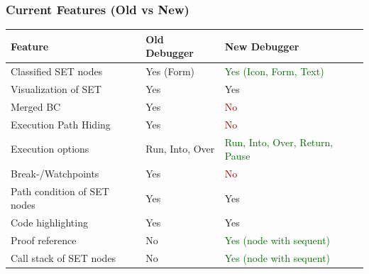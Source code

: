 \documentclass[accentcolor=tud9d,colorbacktitle,inverttitle,landscape,english,presentation,t]{tudbeamer}
\begin{document}
   	\begin{frame}[t]
		\frametitle{Current Features (Old vs New)}
      
      \begin{table}
         \centering
            \begin{tabular}{|l|l|l|}
               \hline
               Feature & Old Debugger & New Debugger \\
               \hline
               \hline
               Classified SET nodes & Yes (Form) & \textcolor{darkgreen}{Yes (Icon, Form, Text)} \\
               Visualization of SET & Yes & Yes \\
               Merged BC & Yes & \textcolor{darkred}{No} \\
               Execution Path Hiding & Yes & \textcolor{darkred}{No} \\ %
               Execution options & Run, Into, Over & \textcolor{darkgreen}{Run, Into, Over, Return, Pause} \\
               Break-/Watchpoints & Yes & \textcolor{darkred}{No} \\
               Path condition of SET nodes & Yes & Yes \\
               Code highlighting & Yes & Yes \\
               Proof reference & No & \textcolor{darkgreen}{Yes (node with sequent)} \\
               Call stack of SET nodes & No & \textcolor{darkgreen}{Yes (node with sequent)} \\
               \hline
            \end{tabular}
      \end{table}
	\end{frame}
   
\end{document}
